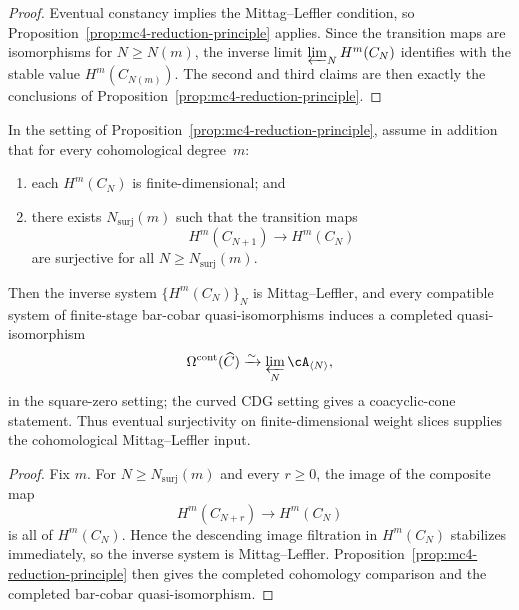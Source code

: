 \begin{proof}
Eventual constancy implies the Mittag--Leffler condition, so
Proposition~\ref{prop:mc4-reduction-principle} applies. Since the
transition maps are isomorphisms for $N \ge N(m)$, the inverse limit
$\varprojlim_N H^m(C_N)$ identifies with the stable value
$H^m(C_{N(m)})$. The second and third claims are then exactly the
conclusions of
Proposition~\ref{prop:mc4-reduction-principle}.
\end{proof}

\begin{corollary}
\label{cor:mc4-surjective-criterion}
In the setting of Proposition~\ref{prop:mc4-reduction-principle},
assume in addition that for every cohomological degree~$m$:
\begin{enumerate}
\item each $H^m(C_N)$ is finite-dimensional; and
\item there exists $N_{\mathrm{surj}}(m)$ such that the transition maps
 \[
 H^m(C_{N+1}) \longrightarrow H^m(C_N)
 \]
 are surjective for all $N \ge N_{\mathrm{surj}}(m)$.
\end{enumerate}
Then the inverse system $\{H^m(C_N)\}_N$ is Mittag--Leffler, and every
compatible system of finite-stage bar-cobar quasi-isomorphisms induces a
completed quasi-isomorphism
\[
\Omega^{\mathrm{cont}}(\widehat{C})
\xrightarrow{\sim}
\varprojlim_N \cA_{\langle N\rangle},
\]
in the square-zero setting; the curved CDG setting gives a
coacyclic-cone statement.  Thus eventual surjectivity on
finite-dimensional weight slices supplies the cohomological
Mittag--Leffler input.
\end{corollary}

\begin{proof}
Fix $m$. For $N \ge N_{\mathrm{surj}}(m)$ and every $r \ge 0$, the image
of the composite map
\[
H^m(C_{N+r}) \longrightarrow H^m(C_N)
\]
is all of $H^m(C_N)$. Hence the descending image filtration in
$H^m(C_N)$ stabilizes immediately, so the inverse system is
Mittag--Leffler. Proposition~\ref{prop:mc4-reduction-principle} then
gives the completed cohomology comparison and the completed bar-cobar
quasi-isomorphism.
\end{proof}

